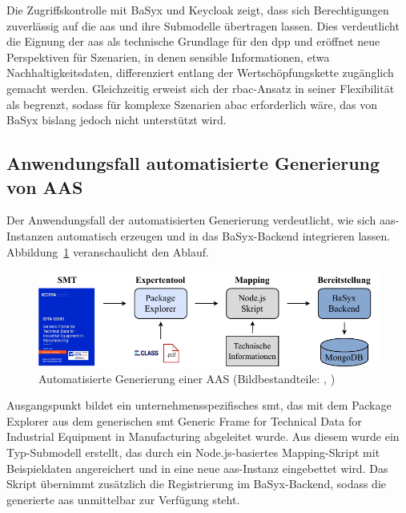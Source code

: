 Die Zugriffskontrolle mit BaSyx und Keycloak zeigt, dass sich Berechtigungen zuverlässig auf die \acs{aas} und ihre Submodelle übertragen lassen. 
Dies verdeutlicht die Eignung der \acs{aas} als technische Grundlage für den \acs{dpp} und eröffnet neue Perspektiven für Szenarien, in denen sensible Informationen, etwa Nachhaltigkeitsdaten, differenziert entlang der Wertschöpfungskette zugänglich gemacht werden. 
Gleichzeitig erweist sich der \acs{rbac}-Ansatz in seiner Flexibilität als begrenzt, sodass für komplexe Szenarien \acs{abac} erforderlich wäre, das von BaSyx bislang jedoch nicht unterstützt wird.

\newpage
\subsection{Anwendungsfall automatisierte Generierung von AAS}

Der Anwendungsfall der automatisierten Generierung verdeutlicht, wie sich \acs{aas}-In\-stanzen automatisch erzeugen und in das BaSyx-Backend integrieren lassen.
Abbildung~\ref{fig:AutomatisierteGenerierungAblauf} veranschaulicht den Ablauf.

\vspace{-0.5em}
\begin{figure}[htbp]
    \centering
        \includegraphics[width=\textwidth]{Bilder/ErgebnisseAutomatisierteGenerierung/ARchitekturTest.pdf}
    \caption[Automatisierte Generierung einer AAS]{Automatisierte Generierung einer AAS (Bildbestandteile: \cite{SpezifikaitonTechnischeDaten}, \cite{ECLASSLogo})}
    \label{fig:AutomatisierteGenerierungAblauf}
\end{figure}
\vspace{-0.5em}

Ausgangspunkt bildet ein unternehmensspezifisches \acs{smt}, das mit dem Package Explorer aus dem generischen \acs{smt} Generic Frame for Technical Data for Industrial Equipment in Manufacturing \cite{SpezifikaitonTechnischeDaten} abgeleitet wurde.
Aus diesem wurde ein Typ-Submodell erstellt, das durch ein Node.js-basiertes Mapping-Skript mit Beispieldaten angereichert und in eine neue \acs{aas}-Instanz eingebettet wird. 
Das Skript übernimmt zusätzlich die Registrierung im BaSyx-Backend, sodass die generierte \acs{aas} unmittelbar zur Verfügung steht.

